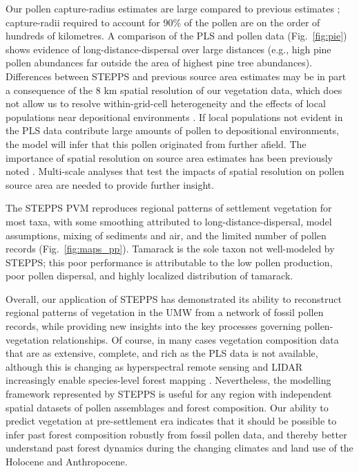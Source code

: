 \documentclass[12pt]{article}
\begin{document}
Our pollen capture-radius estimates are large compared to previous
estimates
\citep{sugita2007theory2,sugita1994pollen,williams2003palynological,prentice1987quantitative,bradshaw1985relationships};
capture-radii required to account for 90\% of the pollen are on the
order of hundreds of kilometres. A comparison of the PLS and pollen
data (Fig.~\ref{fig:pie}) shows evidence of long-distance-dispersal
over large distances (e.g., high pine pollen abundances far outside
the area of highest pine tree abundances). Differences between STEPPS
and previous source area estimates may be in part a consequence of the
8 km spatial resolution of our vegetation data, which does not allow
us to resolve within-grid-cell heterogeneity and the effects of local
populations near depositional environments
\citep{jacobson1981selection, bradshaw1985relationships,
  jackson1990}. If local populations not evident in the PLS data
contribute large amounts of pollen to depositional environments, the
model will infer that this pollen originated from further afield. The
importance of spatial resolution on source area estimates has been
previously noted \citep{sugita1994pollen}. Multi-scale analyses that
test the impacts of spatial resolution on pollen source area are
needed to provide further insight.

The STEPPS PVM reproduces regional patterns of settlement vegetation
for most taxa, with some smoothing attributed to
long-distance-dispersal, model assumptions, mixing of sediments and
air, and the limited number of pollen records
(Fig.~\ref{fig:maps_pp}). Tamarack is the sole taxon not well-modeled
by STEPPS; this poor performance is attributable to the low pollen
production, poor pollen dispersal, and highly localized distribution
of tamarack.

Overall, our application of STEPPS has demonstrated its ability to
reconstruct regional patterns of vegetation in the UMW from a network
of fossil pollen records, while providing new insights into the key
processes governing pollen-vegetation relationships. Of course, in
many cases vegetation composition data that are as extensive,
complete, and rich as the PLS data is not available, although this is
changing as hyperspectral remote sensing and LIDAR increasingly enable
species-level forest mapping \citep{asner2012universal}. Nevertheless, the modelling
framework represented by STEPPS is useful for any region with
independent spatial datasets of pollen assemblages and forest
composition. Our ability to predict vegetation at pre-settlement era
indicates that it should be possible to infer past forest composition
robustly from fossil pollen data, and thereby better understand past
forest dynamics during the changing climates and land use of the
Holocene and Anthropocene.
\end{document}

